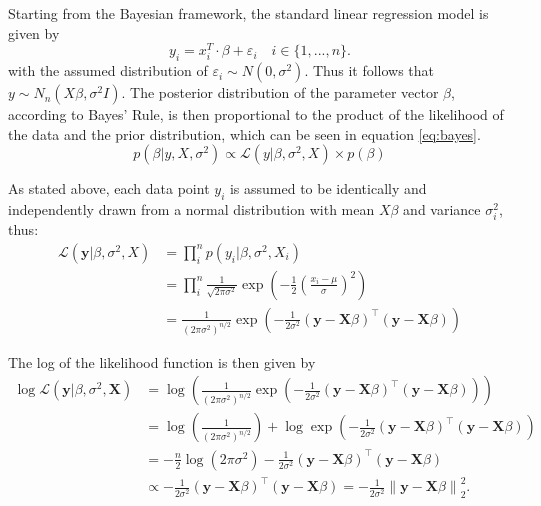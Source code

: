 \documentclass[12pt,a4paper]{article}
\newcommand{\norm}[1]{\left\lVert#1\right\rVert}
\begin{document}
Starting from the Bayesian framework, the standard linear regression model is given by
\[
y_i = x_i^T\cdot \beta + \varepsilon_i \quad i\in \{1,...,n\}. 
\]
with the assumed distribution of $\varepsilon_i \sim N(0,\sigma^2)$. Thus it follows that $y\sim N_n(X\beta,\sigma^2I)$. The posterior distribution of the parameter vector $\beta$, according to Bayes' Rule, is then proportional to the product of the likelihood of the data and the prior distribution, which can be seen in equation \ref{eq:bayes}.
\begin{equation}\label{eq:bayes}
p(\beta|y, X, \sigma^2) \propto \mathcal{L}(y|\beta, \sigma^2, X)\times p(\beta)
\end{equation}	

As stated above, each data point $y_i$ is assumed to be identically and independently drawn from a normal distribution with mean $X\beta$ and variance $\sigma_i^2$, thus:
\begin{align}
\mathcal{L}(\mathbf{y}|\beta, \sigma^2, X) 	&= \prod_i^n p(y_i|\beta, \sigma^2, X_i) \nonumber\\
						&= \prod_i^n \frac{1}{\sqrt{2\pi\sigma^2}} \exp\left(-\frac{1}{2}\left(\frac{x_i-\mu}{\sigma}\right)^2\right) \nonumber\\
						&= \frac{1}{(2\pi\sigma^2)^{n/2}}\exp\left(-\frac{1}{2\sigma^2}(\mathbf{y}-\mathbf{X}\beta)^\top(\mathbf{y}-\mathbf{X}\beta)\right) \label{eq:likelihood}
\end{align}

The log of the likelihood function is then given by 
\begin{align*}
\log \mathcal{L}( \mathbf{y} |\beta, \sigma^2 , \mathbf{X}) &= \log \left( \frac{1}{(2\pi\sigma^2)^{n/2}} \exp\left(-\frac{1}{2\sigma^2} (\mathbf{y} - \mathbf{X}\beta)^\top (\mathbf{y} - \mathbf{X}\beta)\right) \right) \\
&= \log \left( \frac{1}{(2\pi\sigma^2)^{n/2}} \right) + \log \exp\left(-\frac{1}{2\sigma^2} (\mathbf{y} - \mathbf{X}\beta)^\top (\mathbf{y} - \mathbf{X}\beta)\right) \\
&= -\frac{n}{2} \log(2\pi\sigma^2) - \frac{1}{2\sigma^2} (\mathbf{y} - \mathbf{X}\beta)^\top (\mathbf{y} - \mathbf{X}\beta)\\
&\propto - \frac{1}{2\sigma^2} (\mathbf{y} - \mathbf{X}\beta)^\top (\mathbf{y} - \mathbf{X}\beta) = - \frac{1}{2\sigma^2}\norm{\mathbf{y} - \mathbf{X}\beta}_2^2.\\
\end{align*}
\end{document}
